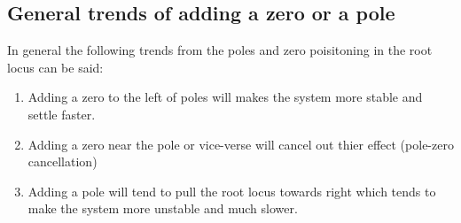 \subsection{General trends of adding a zero or a pole}

In general the following trends from the poles and zero poisitoning in the root locus can be said:
\begin{enumerate}
	\item Adding a zero to the left of poles will makes the system more stable and settle faster.
	\item Adding a zero near the pole or vice-verse will cancel out thier effect (pole-zero cancellation)
	\item Adding a pole will tend to pull the root locus towards right which tends to make the system more unstable and much slower.
\end{enumerate}